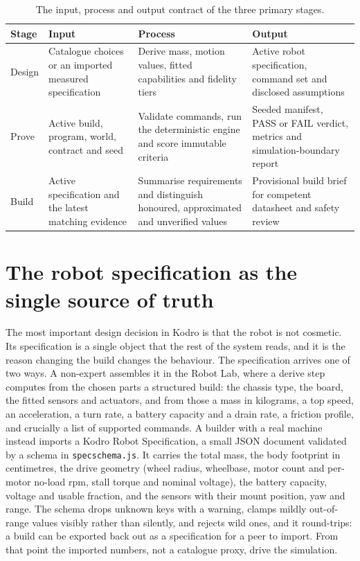 \documentclass[11pt,a4paper]{report}
\begin{document}
\begin{table}[h]
\centering\footnotesize
\renewcommand{\arraystretch}{1.1}
\begin{tabular}{p{1.7cm}p{3.9cm}p{4.2cm}p{3.8cm}}
\toprule
Stage & Input & Process & Output \\
\midrule
Design & Catalogue choices or an imported measured specification & Derive mass, motion values, fitted capabilities and fidelity tiers & Active robot specification, command set and disclosed assumptions \\
Prove & Active build, program, world, contract and seed & Validate commands, run the deterministic engine and score immutable criteria & Seeded manifest, PASS or FAIL verdict, metrics and simulation-boundary report \\
Build & Active specification and the latest matching evidence & Summarise requirements and distinguish honoured, approximated and unverified values & Provisional build brief for competent datasheet and safety review \\
\bottomrule
\end{tabular}
\caption{The input, process and output contract of the three primary stages.}
\label{tab:ipo}
\end{table}

\section{The robot specification as the single source of truth}
\label{sec:spec}
The most important design decision in Kodro is that the robot is not cosmetic. Its specification is a single object that the rest of the system reads, and it is the reason changing the build changes the behaviour. The specification arrives one of two ways. A non-expert assembles it in the Robot Lab, where a derive step computes from the chosen parts a structured build: the chassis type, the board, the fitted sensors and actuators, and from those a mass in kilograms, a top speed, an acceleration, a turn rate, a battery capacity and a drain rate, a friction profile, and crucially a list of supported commands. A builder with a real machine instead imports a Kodro Robot Specification, a small JSON document validated by a schema in \texttt{specschema.js}. It carries the total mass, the body footprint in centimetres, the drive geometry (wheel radius, wheelbase, motor count and per-motor no-load rpm, stall torque and nominal voltage), the battery capacity, voltage and usable fraction, and the sensors with their mount position, yaw and range. The schema drops unknown keys with a warning, clamps mildly out-of-range values visibly rather than silently, and rejects wild ones, and it round-trips: a build can be exported back out as a specification for a peer to import. From that point the imported numbers, not a catalogue proxy, drive the simulation.
\end{document}
